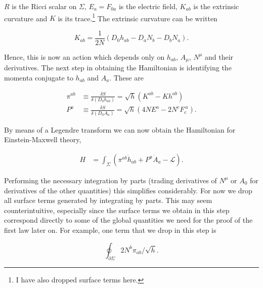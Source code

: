\documentclass[titlepage]{article}
\newcommand{\Lg}{\mathcal{L}}
\def\beq{\begin{equation}}
\def\eeq{\end{equation}}
\begin{document}
\noindent
$R$ is the Ricci scalar on $\Sigma$, $E_a = F_{0a}$ is the electric field, $K_{ab}$ is the extrinsic curvature and $K$ is its trace.\footnote{I have also dropped surface terms here.}  The extrinsic curvature can be written

\beq
K_{ab}= \frac{1}{2N}\left(D_0 h_{ab}-D_aN_b-D_bN_a\right).
\eeq

\noindent
Hence, this is now an action which depends only on $h_{ab}$, $A_\mu$, $N^\mu$ and their derivatives.  The next step in obtaining the Hamiltonian is identifying the momenta conjugate to $h_{ab}$ and $A_a$.  These are


\beq
\begin{aligned}
\pi^{ab} &\equiv \frac{\delta S}{\delta \left(D_0 h_{ab}\right)} = \sqrt{h}\left( K^{ab} - K h^{ab} \right) \\
P^a &\equiv \frac{\delta S}{\delta \left(D_0 A_{a}\right)} = \sqrt{h} \left( 4 N E^a -2 N^c F_c^{\ a} \right).
\end{aligned}
\eeq 

\noindent
By means of a Legendre transform we can now obtain the Hamiltonian for Einstein-Maxwell theory,


\beq
\begin{aligned}
H &= \int_\Sigma \left( \pi^{ab} \dot{h}_{ab} + P^a \dot{A}_a - \Lg \right) .
\end{aligned}
\eeq

Performing the necessary integration by parts (trading derivatives of $N^\mu$ or $A_0$ for derivatives of the other quantities) this simplifies considerably.  For now we drop all surface terms generated by integrating by parts.  This may seem counterintuitive, especially since the surface terms we obtain in this step correspond directly to some of the global quantities we need for the proof of the first law later on. For example, one term that we drop in this step is 

\beq
\oint_{\partial \Sigma} 2N^b\pi_{ab}/\sqrt{h}.
\eeq
\end{document}
